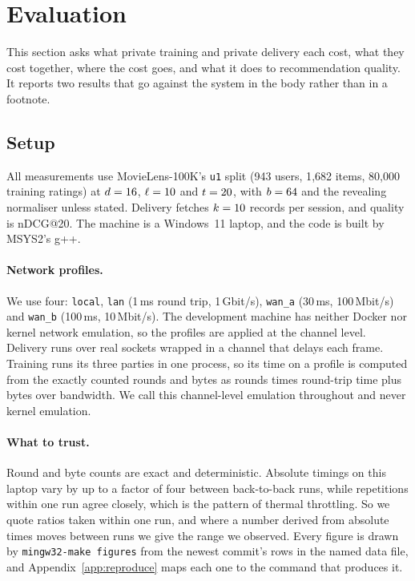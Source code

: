 \section{Evaluation}
\label{sec:eval}

This section asks what private training and private delivery each cost, what
they cost together, where the cost goes, and what it does to recommendation
quality. It reports two results that go against the system in the body rather
than in a footnote.

\subsection{Setup}
\label{sec:eval:setup}

All measurements use MovieLens-100K's \texttt{u1} split (943 users, 1{,}682
items, 80{,}000 training ratings) at $d = 16$, $\ell = 10$ and $t =
20$, with $b = 64$ and the revealing normaliser unless stated. Delivery
fetches $k = 10$ records per session, and quality is nDCG@20. The machine is
a Windows~11 laptop, and the code is built by MSYS2's g++.

\paragraph{Network profiles.} We use four: \texttt{local}, \texttt{lan} (1\,ms
round trip, 1\,Gbit/s), \texttt{wan\_a} (30\,ms, 100\,Mbit/s) and \texttt{wan\_b}
(100\,ms, 10\,Mbit/s). The development machine has neither Docker nor kernel
network emulation, so the profiles are applied at the channel level. Delivery
runs over real sockets wrapped in a channel that delays each frame. Training runs
its three parties in one process, so its time on a profile is computed from the
exactly counted rounds and bytes as rounds times round-trip time plus bytes over
bandwidth. We call this channel-level emulation throughout and never kernel
emulation.

\paragraph{What to trust.} Round and byte counts are exact and deterministic.
Absolute timings on this laptop vary by up to a factor of four between
back-to-back runs, while repetitions within one run agree closely, which is the
pattern of thermal throttling. So we quote ratios taken within one run, and where
a number derived from absolute times moves between runs we give the range we
observed. Every figure is drawn by \texttt{mingw32-make figures} from the newest
commit's rows in the named data file, and Appendix~\ref{app:reproduce} maps each
one to the command that produces it.

